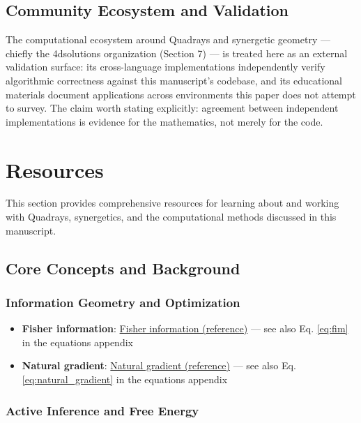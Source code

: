 \documentclass[
  10pt,
]{article}
\providecommand{\tightlist}{%
  \setlength{\itemsep}{0pt}\setlength{\parskip}{0pt}}
\begin{document}
\subsection{Community Ecosystem and
Validation}\label{community-ecosystem-and-validation}

The computational ecosystem around Quadrays and synergetic geometry ---
chiefly the 4dsolutions organization (Section 7) --- is treated here as
an external validation surface: its cross-language implementations
independently verify algorithmic correctness against this manuscript's
codebase, and its educational materials document applications across
environments this paper does not attempt to survey. The claim worth
stating explicitly: agreement between independent implementations is
evidence for the mathematics, not merely for the code.

\newpage

\section{Resources}\label{resources}

This section provides comprehensive resources for learning about and
working with Quadrays, synergetics, and the computational methods
discussed in this manuscript.

\subsection{Core Concepts and
Background}\label{core-concepts-and-background}

\subsubsection{Information Geometry and
Optimization}\label{information-geometry-and-optimization}

\begin{itemize}
\tightlist
\item
  \textbf{Fisher information}:
  \href{https://en.wikipedia.org/wiki/Fisher_information}{Fisher
  information (reference)} --- see also Eq. \eqref{eq:fim} in the
  equations appendix
\item
  \textbf{Natural gradient}:
  \href{https://en.wikipedia.org/wiki/Natural_gradient}{Natural gradient
  (reference)} --- see also Eq. \eqref{eq:natural_gradient} in the
  equations appendix
\end{itemize}

\subsubsection{Active Inference and Free
Energy}\label{active-inference-and-free-energy-1}
\end{document}
